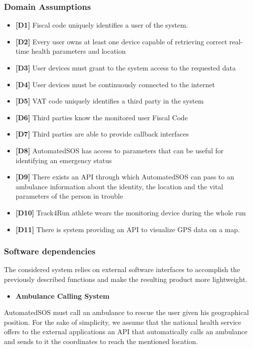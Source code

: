 \subsubsection{Domain Assumptions}
\begin{itemize}
	\item \textbf{[D1]} Fiscal code uniquely identifies a user of the system.
	\item \textbf{[D2]} Every user owns at least one device capable of retrieving correct real-time health parameters and location
	\item \textbf{[D3]} User devices must grant to the system access to the requested data
	\item \textbf{[D4]} User devices must be continuously connected to the internet
	\item \textbf{[D5]} VAT code uniquely identifies a third party in the system
	\item \textbf{[D6]} Third parties know the monitored user Fiscal Code
	\item \textbf{[D7]} Third parties are able to provide callback interfaces
	\item \textbf{[D8]} AutomatedSOS has access to parameters that can be useful for identifying an emergency status
	\item \textbf{[D9]} There exists an API through which AutomatedSOS can pass to an ambulance information about the identity, the location and the vital parameters of the person in trouble
	\item \textbf{[D10]} Track4Run athlete wears the monitoring device during the whole run
	\item \textbf{[D11]} There is system providing an API to visualize GPS data on a map.
\end{itemize}

\subsubsection{Software dependencies}
The considered system relies on external software interfaces to accomplish the previously described functions and make the resulting product more lightweight.

\begin{itemize}
	\item \textbf{Ambulance Calling System}
\end{itemize}

AutomatedSOS must call an ambulance to rescue the user given his geographical position. For the sake of simplicity, we assume that the national health service offers to the external applications an API that automatically calls an ambulance and sends to it the coordinates to reach the mentioned location.

